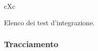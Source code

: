 \begin{table}[H]
\begin{paddedtablex}[1.7]{\textwidth}{cXc}
		\bottomrule\\
	\end{paddedtablex}
	\caption{Elenco dei test d'integrazione.}
\end{table}

	\subsubsection{Tracciamento} \label{tracciamentointegrazione}

